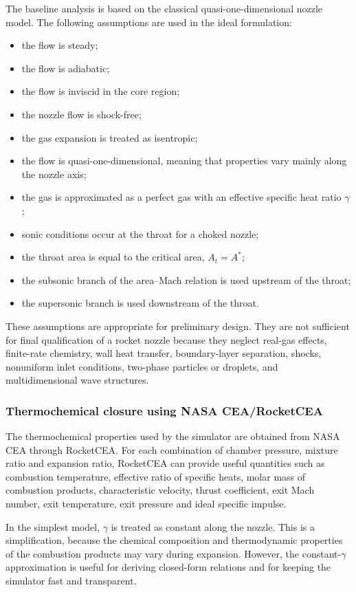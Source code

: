 \documentclass[11pt,a4paper]{article}
\begin{document}
The baseline analysis is based on the classical quasi-one-dimensional nozzle model. The following assumptions are used in the ideal formulation:
\begin{itemize}
    \item the flow is steady;
    \item the flow is adiabatic;
    \item the flow is inviscid in the core region;
    \item the nozzle flow is shock-free;
    \item the gas expansion is treated as isentropic;
    \item the flow is quasi-one-dimensional, meaning that properties vary mainly along the nozzle axis;
    \item the gas is approximated as a perfect gas with an effective specific heat ratio $\gamma$;
    \item sonic conditions occur at the throat for a choked nozzle;
    \item the throat area is equal to the critical area, $A_t=A^*$;
    \item the subsonic branch of the area--Mach relation is used upstream of the throat;
    \item the supersonic branch is used downstream of the throat.
\end{itemize}

These assumptions are appropriate for preliminary design. They are not sufficient for final qualification of a rocket nozzle because they neglect real-gas effects, finite-rate chemistry, wall heat transfer, boundary-layer separation, shocks, nonuniform inlet conditions, two-phase particles or droplets, and multidimensional wave structures.

\subsubsection{Thermochemical closure using NASA CEA/RocketCEA}

The thermochemical properties used by the simulator are obtained from NASA CEA through RocketCEA. For each combination of chamber pressure, mixture ratio and expansion ratio, RocketCEA can provide useful quantities such as combustion temperature, effective ratio of specific heats, molar mass of combustion products, characteristic velocity, thrust coefficient, exit Mach number, exit temperature, exit pressure and ideal specific impulse.

In the simplest model, $\gamma$ is treated as constant along the nozzle. This is a simplification, because the chemical composition and thermodynamic properties of the combustion products may vary during expansion. However, the constant-$\gamma$ approximation is useful for deriving closed-form relations and for keeping the simulator fast and transparent.
\end{document}
